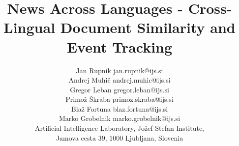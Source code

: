\documentclass[twoside,11pt]{article}
\begin{document}
\title{News Across Languages -
Cross-Lingual Document Similarity and Event Tracking}

\author{\name Jan Rupnik \email jan.rupnik@ijs.si \\
       \name Andrej Muhi\v{c} \email andrej.muhic@ijs.si \\
       \name Gregor Leban \email gregor.leban@ijs.si \\
       \name Primo\v{z} \v{S}kraba \email primoz.skraba@ijs.si \\
       \name Bla\v{z} Fortuna \email blaz.fortuna@ijs.si \\
       \name Marko Grobelnik \email marko.grobelnik@ijs.si \\
       \addr Artificial Intelligence Laboratory, Jo\v{z}ef Stefan Institute,\\
       Jamova cesta 39, 1000 Ljubljana, Slovenia}

\maketitle
\end{document}
